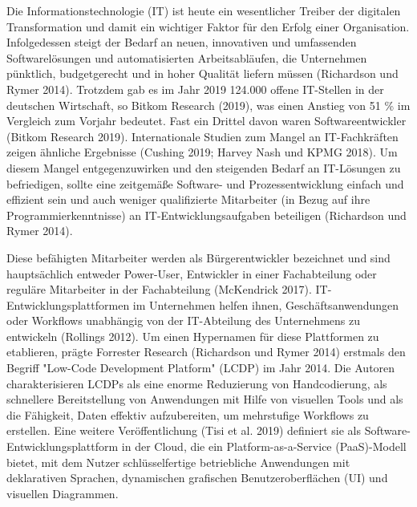 \documentclass{article}
\begin{document}
	Die Informationstechnologie (IT) ist heute ein wesentlicher Treiber der digitalen Transformation und damit ein wichtiger
	Faktor für den Erfolg einer Organisation. Infolgedessen steigt der Bedarf an neuen, innovativen und umfassenden
	Softwarelösungen und automatisierten Arbeitsabläufen, die Unternehmen pünktlich, budgetgerecht und in hoher Qualität liefern müssen (Richardson und Rymer 2014). 
	Trotzdem gab es im Jahr 2019 124.000 offene IT-Stellen in der deutschen Wirtschaft, so Bitkom Research (2019), was einen
	Anstieg von 51 \% im Vergleich zum Vorjahr bedeutet. Fast ein Drittel davon waren Softwareentwickler (Bitkom Research 2019). 
	Internationale Studien zum Mangel an IT-Fachkräften zeigen ähnliche Ergebnisse (Cushing 2019; Harvey Nash und KPMG 2018). Um diesem Mangel entgegenzuwirken und den steigenden Bedarf an IT-Lösungen zu befriedigen, sollte eine zeitgemäße Software- und Prozessentwicklung einfach und effizient sein und auch weniger qualifizierte Mitarbeiter (in Bezug auf ihre Programmierkenntnisse) an IT-Entwicklungsaufgaben beteiligen (Richardson und Rymer 2014). 
	
	Diese befähigten Mitarbeiter werden als Bürgerentwickler bezeichnet und sind hauptsächlich entweder Power-User, Entwickler in einer Fachabteilung oder reguläre Mitarbeiter in der Fachabteilung (McKendrick 2017).
	IT-Entwicklungsplattformen im Unternehmen helfen ihnen, Geschäftsanwendungen oder Workflows unabhängig von der IT-Abteilung des Unternehmens zu entwickeln (Rollings 2012). 
	Um einen Hypernamen für diese Plattformen zu etablieren, prägte Forrester Research (Richardson und Rymer 2014) erstmals den Begriff "Low-Code Development Platform" (LCDP) im Jahr 2014. Die Autoren charakterisieren LCDPs als eine enorme Reduzierung von Handcodierung, als schnellere Bereitstellung von Anwendungen mit Hilfe von visuellen Tools und als die Fähigkeit, Daten effektiv aufzubereiten, um mehrstufige Workflows zu erstellen. 
	Eine weitere Veröffentlichung (Tisi et al. 2019) definiert sie als Software-Entwicklungsplattform in der Cloud, die ein Platform-as-a-Service (PaaS)-Modell bietet, mit dem Nutzer schlüsselfertige betriebliche Anwendungen mit deklarativen Sprachen, dynamischen grafischen Benutzeroberflächen (UI) und visuellen Diagrammen.
	
\end{document}
